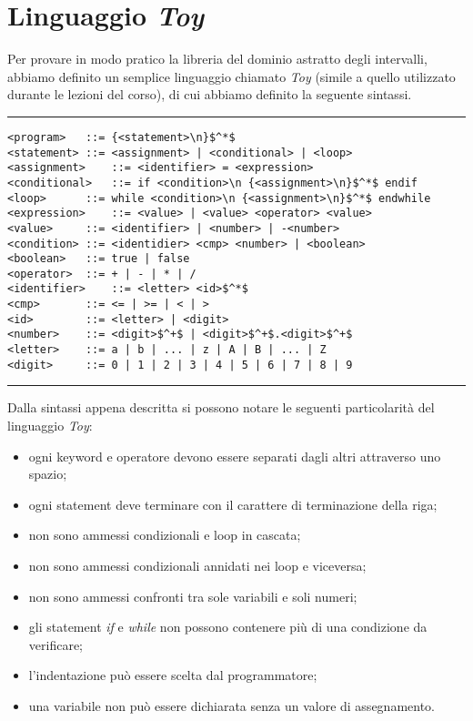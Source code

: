 \documentclass[a4paper, 10pt]{report}
\begin{document}
\section*{Linguaggio \textit{Toy}}
Per provare in modo pratico la libreria del dominio astratto degli intervalli, abbiamo definito un semplice linguaggio chiamato \textit{Toy} (simile a quello utilizzato durante le lezioni del corso), di cui abbiamo definito la seguente sintassi.
\newline

\hrule
\begin{lstlisting}[basicstyle=\footnotesize\ttfamily]
<program>	::= {<statement>\n}$^*$
<statement>	::= <assignment> | <conditional> | <loop>
<assignment>	::= <identifier> = <expression>
<conditional>	::= if <condition>\n {<assignment>\n}$^*$ endif
<loop>		::= while <condition>\n {<assignment>\n}$^*$ endwhile 
<expression>	::= <value> | <value> <operator> <value>
<value>		::= <identifier> | <number> | -<number>
<condition>	::= <identidier> <cmp> <number> | <boolean>
<boolean>	::= true | false
<operator>	::= + | - | * | / 
<identifier>	::= <letter> <id>$^*$
<cmp>		::= <= | >= | < | >
<id>		::= <letter> | <digit>
<number>	::= <digit>$^+$ | <digit>$^+$.<digit>$^+$
<letter>	::= a | b | ... | z | A | B | ... | Z
<digit>		::= 0 | 1 | 2 | 3 | 4 | 5 | 6 | 7 | 8 | 9
\end{lstlisting}

\hrule
\newpage
\noindent
Dalla sintassi appena descritta si possono notare le seguenti particolarità del linguaggio \textit{Toy}:
\begin{itemize}
	\item ogni keyword e operatore devono essere separati dagli altri attraverso uno spazio;
	\item ogni statement deve terminare con il carattere di terminazione della riga;
	\item non sono ammessi condizionali e loop in cascata;
	\item non sono ammessi condizionali annidati nei loop e viceversa;
	\item non sono ammessi confronti tra sole variabili e soli numeri;
	\item gli statement \textit{if} e \textit{while} non possono contenere più di una condizione da verificare;
	\item l'indentazione può essere scelta dal programmatore;
	\item una variabile non può essere dichiarata senza un valore di assegnamento.
\end{itemize}
\end{document}
